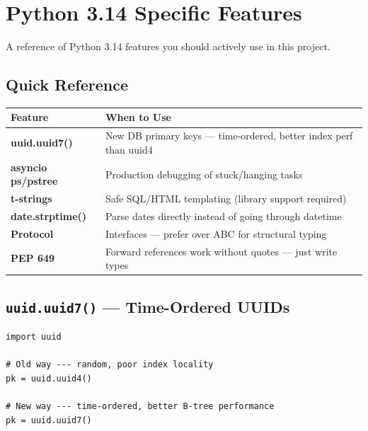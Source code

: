 \documentclass[11pt,a4paper,oneside]{book}
\newcommand{\py}[1]{\texttt{\color{pyblue}#1}}
\begin{document}
\chapter{Python 3.14 Specific Features}

A reference of Python 3.14 features you should actively use in this project.

\section{Quick Reference}

\begin{center}
\renewcommand{\arraystretch}{1.4}
\begin{tcolorbox}[
    colback=codebg,
    colframe=pyblue,
    width=0.98\textwidth,
    arc=3pt,
    boxrule=1pt,
]
\begin{tabularx}{\textwidth}{>{\bfseries\ttfamily}l X}
\toprule
Feature & When to Use \\
\midrule
uuid.uuid7() & New DB primary keys --- time-ordered, better index perf than uuid4 \\
asyncio ps/pstree & Production debugging of stuck/hanging tasks \\
t-strings & Safe SQL/HTML templating (library support required) \\
date.strptime() & Parse dates directly instead of going through datetime \\
Protocol & Interfaces --- prefer over ABC for structural typing \\
PEP 649 & Forward references work without quotes --- just write types \\
\bottomrule
\end{tabularx}
\end{tcolorbox}
\end{center}

\section{\py{uuid.uuid7()} --- Time-Ordered UUIDs}

\begin{lstlisting}[style=python]
import uuid

# Old way --- random, poor index locality
pk = uuid.uuid4()

# New way --- time-ordered, better B-tree performance
pk = uuid.uuid7()
\end{lstlisting}
\end{document}
